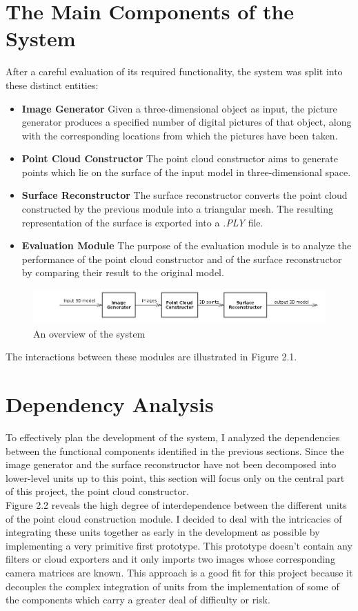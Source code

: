 \documentclass[12pt,a4paper,twoside,openright]{report}
\begin{document}
\section{The Main Components of the System}
After a careful evaluation of its required functionality, the system was split into these distinct entities:
\begin{itemize}
\item \textbf{Image Generator}
Given a three-dimensional object as input, the picture generator produces a specified number of digital pictures of that object, along with the corresponding locations from which the pictures have been taken. 
\item \textbf{Point Cloud Constructor}
The point cloud constructor aims to generate points which lie on the surface of the input model in three-dimensional space. 
\item \textbf{Surface Reconstructor}
The surface reconstructor converts the point cloud constructed by the previous module into a triangular mesh. The resulting representation of the surface is exported into a \textit{.PLY} file.
\item \textbf{Evaluation Module}
The purpose of the evaluation module is to analyze the performance of the point cloud constructor and of the surface reconstructor by comparing their result to the original model. \\
\end{itemize}
\begin{figure}
\centerline{\includegraphics[scale=0.7]{figs/overview.png}}
\caption{An overview of the system}
\end{figure}
The interactions between these modules are illustrated in Figure 2.1.

\section{Dependency Analysis}
To effectively plan the development of the system, I analyzed the dependencies between the functional components identified in the previous sections. Since the image generator and the surface reconstructor have not been decomposed into lower-level units up to this point, this section will focus only on the central part of this project, the point cloud constructor.\\
\pagebreak
Figure 2.2 reveals the high degree of interdependence between the different units of the point cloud construction module. I decided to deal with the intricacies of integrating these units together as early in the development as possible by implementing a very primitive first prototype. This prototype doesn't contain any filters or cloud exporters and it only imports two images whose corresponding camera matrices are known. This approach is a good fit for this project because it decouples the complex integration of units from the implementation of some of the components which carry a greater deal of difficulty or risk. 
\end{document}
